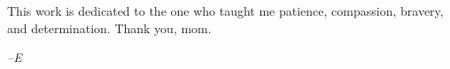 
\begin{dedication}
This work is dedicated to the one who taught me patience, compassion, bravery, and determination. Thank you, mom.
  
\begin{center}
\emph{--E}
\end{center}
\end{dedication}